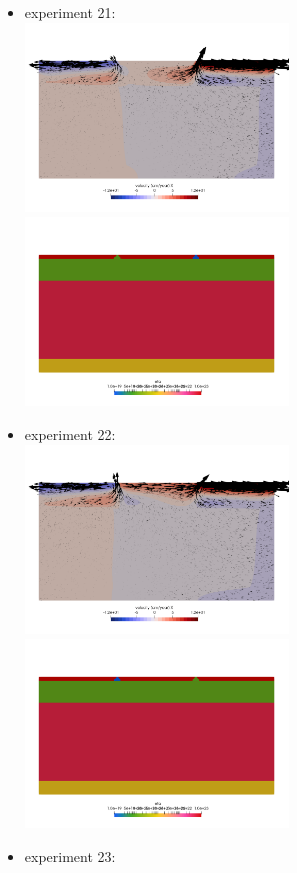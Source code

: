 \newpage
\begin{itemize}
\item experiment 21:\\
\includegraphics[width=7cm]{python_codes/fieldstone_148/results/vels_0020}
\includegraphics[width=7cm]{python_codes/fieldstone_148/results/etas_0020}
\item experiment 22:\\
\includegraphics[width=7cm]{python_codes/fieldstone_148/results/vels_0021}
\includegraphics[width=7cm]{python_codes/fieldstone_148/results/etas_0021}
\item experiment 23:\\

\end{itemize}
